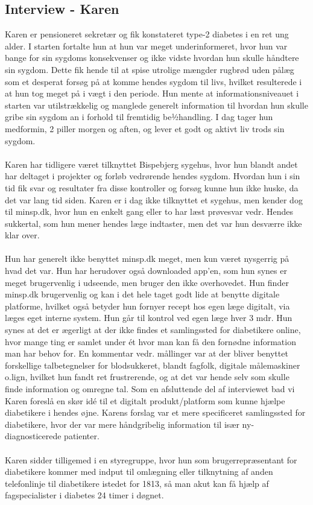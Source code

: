\subsection*{Interview - Karen}
Karen er pensioneret sekretær og fik konstateret type-2 diabetes i en ret ung alder. I starten fortalte hun at hun var meget underinformeret, hvor hun var bange for sin sygdoms konsekvenser og ikke vidste hvordan hun skulle håndtere sin sygdom. Dette fik hende til at spise utrolige mængder rugbrød uden pålæg som et desperat forsøg på at komme hendes sygdom til livs, hvilket resulterede i at hun tog meget på i vægt i den periode. Hun mente at informationsniveauet i starten var utilstrækkelig og manglede generelt information til hvordan hun skulle gribe sin sygdom an i forhold til fremtidig be½handling. I dag tager hun medformin, 2 piller morgen og aften, og lever et godt og aktivt liv trods sin sygdom.
\\ \\
Karen har tidligere været tilknyttet Bispebjerg sygehus, hvor hun blandt andet har deltaget i projekter og forløb vedrørende hendes sygdom. Hvordan hun i sin tid fik svar og resultater fra disse kontroller og forsøg kunne hun ikke huske, da det var lang tid siden. Karen er i dag ikke tilknyttet et sygehus, men kender dog til minsp.dk, hvor hun en enkelt gang eller to har læst prøvesvar vedr. Hendes sukkertal, som hun mener hendes læge indtaster, men det var hun desværre ikke klar over. 
\\ \\
Hun har generelt ikke benyttet minsp.dk meget, men kun været nysgerrig på hvad det var. Hun har herudover også downloaded app'en, som hun synes er meget brugervenlig i udseende, men bruger den ikke overhovedet. Hun finder minsp.dk brugervenlig og kan i det hele taget godt lide at benytte digitale platforme, hvilket også betyder hun fornyer recept hos egen læge digitalt, via læges eget interne system. Hun går til kontrol ved egen læge hver 3 mdr. Hun synes at det er ægerligt at der ikke findes et samlingssted for diabetikere online, hvor mange ting er samlet under ét hvor man kan få den fornødne information man har behov for. En kommentar vedr. mållinger var at der bliver benyttet forskellige talbetegnelser for blodsukkeret, blandt fagfolk, digitale målemaskiner o.lign, hvilket hun fandt ret frustrerende, og at det var hende selv som skulle finde information og omregne tal. 
Som en afsluttende del af interviewet bad vi Karen foreslå en skør idé til et digitalt produkt/platform som kunne hjælpe diabetikere i hendes øjne. Karens forslag var et mere specificeret samlingssted for diabetikere, hvor der var mere håndgribelig information til især ny-diagnosticerede patienter.
\\ \\
Karen sidder tilligemed i en styregruppe, hvor hun som brugerrepræsentant for diabetikere kommer med indput til omlægning eller tilknytning af anden telefonlinje til diabetikere istedet for 1813, så man akut kan få hjælp af fagspecialister i diabetes 24 timer i døgnet.

